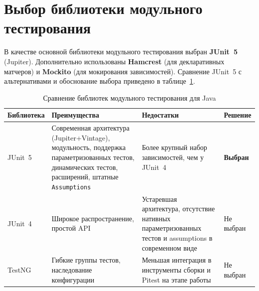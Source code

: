 \section{Выбор библиотеки модульного тестирования} \label{ch3:sec4}

В качестве основной библиотеки модульного тестирования выбран \textbf{JUnit~5} (Jupiter). Дополнительно использованы \textbf{Hamcrest} (для декларативных матчеров) и \textbf{Mockito} (для мокирования зависимостей). Сравнение JUnit~5 с альтернативами и обоснование выбора приведено в таблице~\ref{tab:lib-compare}.

\begin{table}[ht]
\centering\small
\caption{Сравнение библиотек модульного тестирования для Java}
\label{tab:lib-compare}
\begin{tabular}{|p{2.4cm}|p{4.2cm}|p{4.2cm}|p{3.0cm}|}
\hline
\textbf{Библиотека} & \textbf{Преимущества} & \textbf{Недостатки} & \textbf{Решение} \\
\hline
JUnit~5 & Современная архитектура (Jupiter+Vintage), модульность, поддержка параметризованных тестов, динамических тестов, расширений, штатные \texttt{Assumptions} & Более крупный набор зависимостей, чем у JUnit~4 & \textbf{Выбран} \\
\hline
JUnit~4 & Широкое распространение, простой API & Устаревшая архитектура, отсутствие нативных параметризованных тестов и assumptions в современном виде & Не выбран \\
\hline
TestNG & Гибкие группы тестов, наследование конфигурации & Меньшая интеграция в инструменты сборки и Pitest на этапе работы & Не выбран \\
\hline
\end{tabular}
\end{table}

